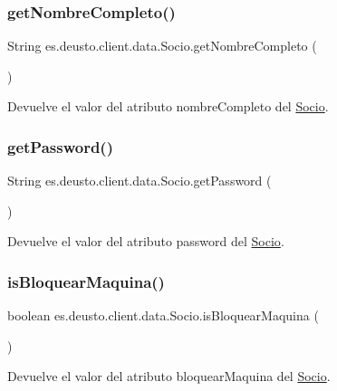 \subsubsection{\texorpdfstring{getNombreCompleto()}{getNombreCompleto()}}
{\footnotesize\ttfamily String es.\+deusto.\+client.\+data.\+Socio.\+get\+Nombre\+Completo (\begin{DoxyParamCaption}{ }\end{DoxyParamCaption})}

Devuelve el valor del atributo nombre\+Completo del \mbox{\hyperlink{classes_1_1deusto_1_1client_1_1data_1_1_socio}{Socio}}. \mbox{\label{classes_1_1deusto_1_1client_1_1data_1_1_socio_a7916f4ed896d0df09332a9538eb469ef}} 
\subsubsection{\texorpdfstring{getPassword()}{getPassword()}}
{\footnotesize\ttfamily String es.\+deusto.\+client.\+data.\+Socio.\+get\+Password (\begin{DoxyParamCaption}{ }\end{DoxyParamCaption})}

Devuelve el valor del atributo password del \mbox{\hyperlink{classes_1_1deusto_1_1client_1_1data_1_1_socio}{Socio}}. \mbox{\label{classes_1_1deusto_1_1client_1_1data_1_1_socio_adfbff36ef58c4373f4a31bc4e780c842}} 
\subsubsection{\texorpdfstring{isBloquearMaquina()}{isBloquearMaquina()}}
{\footnotesize\ttfamily boolean es.\+deusto.\+client.\+data.\+Socio.\+is\+Bloquear\+Maquina (\begin{DoxyParamCaption}{ }\end{DoxyParamCaption})}

Devuelve el valor del atributo bloquear\+Maquina del \mbox{\hyperlink{classes_1_1deusto_1_1client_1_1data_1_1_socio}{Socio}}. \mbox{\label{classes_1_1deusto_1_1client_1_1data_1_1_socio_af8b991eb97c2e96eb292e214d037c3c3}} 

